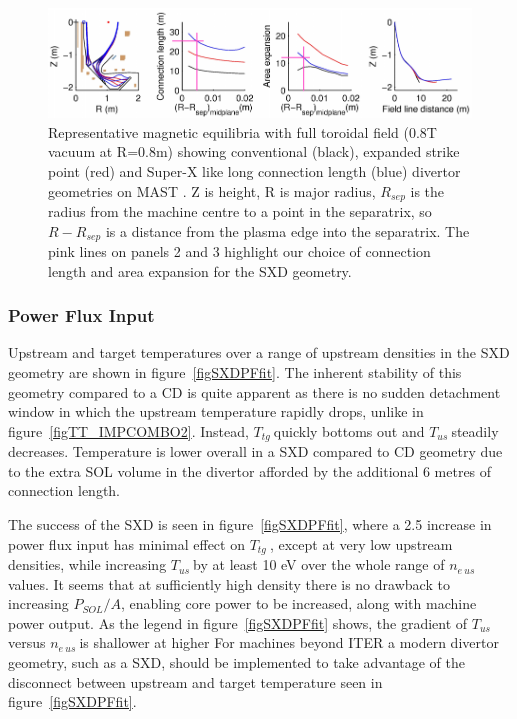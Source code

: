 \documentclass[12pt]{article}  %
\providecommand{\neus}{$n_{e~us}~$} %
\providecommand{\Tus}{$T_{us}~$} %
\providecommand{\Ttg}{$T_{tg}~$} %
\begin{document}
\begin{figure}
\includegraphics[scale=0.75]{Figures/MASTUdesignpapersFig2_2.png}
\centering
\caption{Representative magnetic equilibria with full toroidal field (0.8T vacuum at R=0.8m) showing conventional (black), expanded strike point (red) and Super-X like long connection length (blue) divertor geometries on MAST \cite{Fishpool2013}. Z is height, R is major radius, $ R_{sep} $ is the radius from the machine centre to a point in the separatrix, so $ R - R_{sep} $ is a distance from the plasma edge into the separatrix. The pink lines on panels 2 and 3 highlight our choice of connection length and area expansion for the SXD geometry.}\label{figMASTUdesignpapersFig2}
\end{figure}


\subsubsection{Power Flux Input}\label{sssecPF}
Upstream and target temperatures over a range of upstream densities in the SXD geometry are shown in figure~\ref{figSXDPFfit}. The inherent stability of this geometry compared to a CD is quite apparent as there is no sudden detachment window in which the upstream temperature rapidly drops, unlike in figure~\ref{figTT_IMPCOMBO2}. Instead, \Ttg quickly bottoms out and \Tus steadily decreases. Temperature is lower overall in a SXD compared to CD geometry due to the extra SOL volume in the divertor afforded by the additional 6 metres of connection length. 

The success of the SXD is seen in figure~\ref{figSXDPFfit}, where a 2.5 increase in power flux input has minimal effect on \Ttg, except at very low upstream densities, while increasing \Tus by at least 10 eV over the whole range of \neus values. It seems that at sufficiently high density there is no drawback to increasing $P_{SOL}/A$, enabling core power to be increased, along with machine power output. As the legend in figure~\ref{figSXDPFfit} shows, the gradient of \Tus versus \neus is shallower at higher  For machines beyond ITER a modern divertor geometry, such as a SXD, should be implemented to take advantage of the disconnect between upstream and target temperature seen in figure~\ref{figSXDPFfit}.
\end{document}
